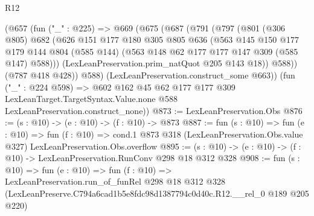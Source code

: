 \begin{lexlean}{R12}
\begin{coremodule}
    (@657
      (fun ("_" : @225) =>
      @669
        (@675
          (@687
            (@791
              (@797
                (@801
                  (@306 @805)
                  @682
                  (@626
                    @151
                    @177
                    @180
                    @305
                    @805
                    @636
                    (@563
                      @145
                      @150
                      @177
                      @179
                      @144
                      @804
                      (@585 @144)
                      (@563 @148 @62 @177 @177 @147 @309 (@585 @147) @588)))
                  (LexLeanPreservation.prim_natQuot @205 @143 @18))
                @588))
            (@787 @418 @428))
          @588)
        (LexLeanPreservation.construct_some @663))
      (fun ("_" : @224 @598) =>
      @602
        @162
        @45
        @62
        @177
        @177
        @309
        LexLeanTarget.TargetSyntax.Value.none
        @588
        LexLeanPreservation.construct_none))
@873 := LexLeanPreservation.Obs
@876 := (s : @10) -> (e : @10) -> (f : @10) -> @873
@887 := fun (s : @10) =>
  fun (e : @10) =>
  fun (f : @10) =>
  cond.{1} @873 @318 (LexLeanPreservation.Obs.value @327) LexLeanPreservation.Obs.overflow
@895 := (s : @10) -> (e : @10) -> (f : @10) -> LexLeanPreservation.RunConv @298 @18 @312 @328
@908 := fun (s : @10) =>
  fun (e : @10) =>
  fun (f : @10) =>
  LexLeanPreservation.run_of_funRel
    @298
    @18
    @312
    @328
    (LexLeanPreserve.C794a6cad1b5e8fdc98d1387794c0d40c.R12.__rel_0 @189 @205 @220)
\end{coremodule}
\end{lexlean}
